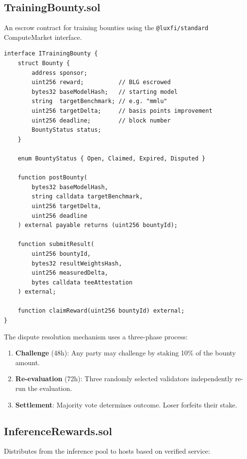 \subsection{TrainingBounty.sol}

An escrow contract for training bounties using the \texttt{@luxfi/standard} ComputeMarket interface.

\begin{lstlisting}[language=Solidity,caption=TrainingBounty core interface]
interface ITrainingBounty {
    struct Bounty {
        address sponsor;
        uint256 reward;          // BLG escrowed
        bytes32 baseModelHash;   // starting model
        string  targetBenchmark; // e.g. "mmlu"
        uint256 targetDelta;     // basis points improvement
        uint256 deadline;        // block number
        BountyStatus status;
    }

    enum BountyStatus { Open, Claimed, Expired, Disputed }

    function postBounty(
        bytes32 baseModelHash,
        string calldata targetBenchmark,
        uint256 targetDelta,
        uint256 deadline
    ) external payable returns (uint256 bountyId);

    function submitResult(
        uint256 bountyId,
        bytes32 resultWeightsHash,
        uint256 measuredDelta,
        bytes calldata teeAttestation
    ) external;

    function claimReward(uint256 bountyId) external;
}
\end{lstlisting}

The dispute resolution mechanism uses a three-phase process:
\begin{enumerate}[nosep]
    \item \textbf{Challenge} (48h): Any party may challenge by staking 10\% of the bounty amount.
    \item \textbf{Re-evaluation} (72h): Three randomly selected \PoAI{} validators independently re-run the evaluation.
    \item \textbf{Settlement}: Majority vote determines outcome. Loser forfeits their stake.
\end{enumerate}

\subsection{InferenceRewards.sol}

Distributes \BLG{} from the inference pool to hosts based on verified service:

